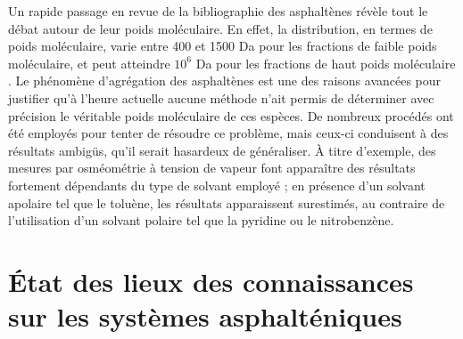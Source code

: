 Un rapide passage en revue de la bibliographie des asphaltènes révèle tout le débat autour de leur poids moléculaire. En effet, la distribution, en termes de poids moléculaire, varie entre 400 et 1500 Da pour les fractions de faible poids moléculaire, et peut atteindre $10^{6}$ Da pour les fractions de haut poids moléculaire \cite{mullins2008contrasting}. Le phénomène d'agrégation des asphaltènes est une des raisons avancées pour justifier qu'à l'heure actuelle aucune méthode n'ait permis de déterminer avec précision le véritable poids moléculaire de ces espèces. De nombreux procédés ont été employés pour tenter de résoudre ce problème, mais ceux-ci conduisent à des résultats ambigüs, qu'il serait hasardeux de généraliser. À titre d'exemple, des mesures par osméométrie à tension de vapeur font apparaître des résultats fortement dépendants du type de solvant employé ; en présence d'un solvant apolaire tel que le toluène, les résultats apparaissent surestimés, au contraire de l'utilisation d'un solvant polaire tel que la pyridine ou le nitrobenzène. 




\section{État des lieux des connaissances sur les systèmes asphalténiques}

